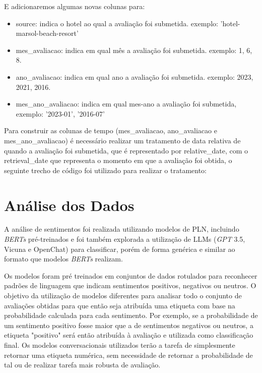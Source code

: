 E adicionaremos algumas novas colunas para:

\begin{itemize}
	\item source: indica o hotel ao qual a avaliação foi submetida. exemplo: 'hotel-marsol-beach-resort'
	\item mes\_avaliacao: indica em qual mês a avaliação foi submetida. exemplo: 1, 6, 8.
	\item ano\_avaliacao: indica em qual ano a avaliação foi submetida. exemplo: 2023, 2021, 2016.
	\item mes\_ano\_avaliacao: indica em qual mes-ano a avaliação foi submetida, exemplo: '2023-01', '2016-07'
\end{itemize}

Para construir as colunas de tempo (mes\_avaliacao, ano\_avaliacao e mes\_ano\_avaliacao) é necessário realizar um tratamento de data relativa de quando a avaliação foi submetida, que é representado por relative\_date, com o retrieval\_date que representa o momento em que a avaliação foi obtida, o seguinte trecho de código foi utilizado para realizar o tratamento:

% 

\section{Análise dos Dados}
\label{cap:metodologia:sec:analise_dados}

A análise de sentimentos foi realizada utilizando modelos de PLN, incluindo \textit{BERTs} pré-treinados e foi também explorada a utilização de LLMs (\textit{GPT} 3.5, Vicuna e OpenChat) para classificar, porém de forma genérica e similar ao formato que modelos \textit{BERTs} realizam.

Os modelos foram pré treinados em conjuntos de dados rotulados para reconhecer padrões de linguagem que indicam sentimentos positivos, negativos ou neutros. O objetivo da utilização de modelos diferentes para analisar todo o conjunto de avaliações obtidas para que então seja atribuída uma etiqueta com base na probabilidade calculada para cada sentimento. Por exemplo, se a probabilidade de um sentimento positivo fosse maior que a de sentimentos negativos ou neutros, a etiqueta "positivo" será então atribuída à avaliação e utilizada como classificação final. Os modelos conversacionais utilizados terão a tarefa de simplesmente retornar uma etiqueta numérica, sem necessidade de retornar a probabilidade de tal ou de realizar tarefa mais robusta de avaliação.

